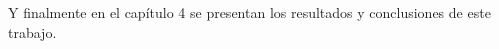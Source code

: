 Y finalmente en el capítulo 4 se presentan los resultados y conclusiones de este trabajo.











%
%
%
%
%
%
